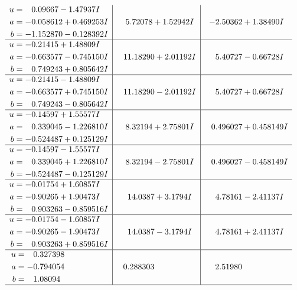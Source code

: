 \documentclass[1p]{elsarticle_modified}
\theoremstyle{definition}
\begin{document}
$$\begin{array}{c|c|c}
\begin{aligned}
u &= \phantom{-}0.09667 - 1.47937 I \\
a &= -0.058612 + 0.469253 I \\
b &= -1.152870 - 0.128392 I\end{aligned}
 & \phantom{-}5.72078 + 1.52942 I & -2.50362 + 1.38490 I \\ \hline\begin{aligned}
u &= -0.21415 + 1.48809 I \\
a &= -0.663577 - 0.745150 I \\
b &= \phantom{-}0.749243 + 0.805642 I\end{aligned}
 & \phantom{-}11.18290 + 2.01192 I & \phantom{-}5.40727 - 0.66728 I \\ \hline\begin{aligned}
u &= -0.21415 - 1.48809 I \\
a &= -0.663577 + 0.745150 I \\
b &= \phantom{-}0.749243 - 0.805642 I\end{aligned}
 & \phantom{-}11.18290 - 2.01192 I & \phantom{-}5.40727 + 0.66728 I \\ \hline\begin{aligned}
u &= -0.14597 + 1.55577 I \\
a &= \phantom{-}0.339045 - 1.226810 I \\
b &= -0.524487 + 0.125129 I\end{aligned}
 & \phantom{-}8.32194 + 2.75801 I & \phantom{-}0.496027 + 0.458149 I \\ \hline\begin{aligned}
u &= -0.14597 - 1.55577 I \\
a &= \phantom{-}0.339045 + 1.226810 I \\
b &= -0.524487 - 0.125129 I\end{aligned}
 & \phantom{-}8.32194 - 2.75801 I & \phantom{-}0.496027 - 0.458149 I \\ \hline\begin{aligned}
u &= -0.01754 + 1.60857 I \\
a &= -0.90265 + 1.90473 I \\
b &= \phantom{-}0.903263 - 0.859516 I\end{aligned}
 & \phantom{-}14.0387 + 3.1794 I & \phantom{-}4.78161 - 2.41137 I \\ \hline\begin{aligned}
u &= -0.01754 - 1.60857 I \\
a &= -0.90265 - 1.90473 I \\
b &= \phantom{-}0.903263 + 0.859516 I\end{aligned}
 & \phantom{-}14.0387 - 3.1794 I & \phantom{-}4.78161 + 2.41137 I \\ \hline\begin{aligned}
u &= \phantom{-}0.327398\phantom{ +0.000000I} \\
a &= -0.794054\phantom{ +0.000000I} \\
b &= \phantom{-}1.08094\phantom{ +0.000000I}\end{aligned}
 & \phantom{-}0.288303\phantom{ +0.000000I} & \phantom{-}2.51980\phantom{ +0.000000I}\\
 \hline 
 \end{array}$$\newpage
\end{document}
